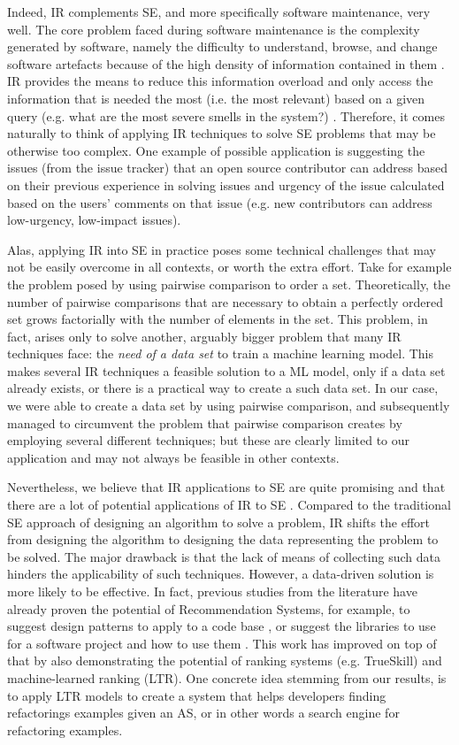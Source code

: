 Indeed, IR complements SE, and more specifically software maintenance, very well.
The core problem faced during software maintenance is the complexity generated by software, namely the difficulty to understand, browse, and change software artefacts because of the high density of information contained in them \cite{Robillard2010}.
IR provides the means to reduce this information overload and only access the information that is needed the most (i.e. the most relevant) based on a given query (e.g. what are the most severe smells in the system?) \cite{Robillard2010}.
Therefore, it comes naturally to think of applying IR techniques to solve SE problems that may be otherwise too complex.
One example of possible application is suggesting the issues (from the issue tracker) that an open source contributor can address based on their previous experience in solving issues and urgency of the issue calculated based on the users' comments on that issue (e.g. new contributors can address low-urgency, low-impact issues).

Alas, applying IR into SE in practice poses some technical challenges that may not be easily overcome in all contexts, or worth the extra effort.
Take for example the problem posed by using pairwise comparison to order a set.
Theoretically, the number of pairwise comparisons that are necessary to obtain a perfectly ordered set grows factorially with the number of elements in the set.
This problem, in fact, arises only to solve another, arguably bigger problem that many IR techniques face: the \emph{need of a data set} to train a machine learning model.
This makes several IR techniques a feasible solution to a ML model, only if a data set already exists, or there is a practical way to create a such data set.
In our case, we were able to create a data set by using pairwise comparison, and subsequently managed to circumvent the problem that pairwise comparison creates by employing several different techniques; but these are clearly limited to our application and may not always be feasible in other contexts.

Nevertheless, we believe that IR applications to SE are quite promising and that there are a lot of potential applications of IR to SE \cite{Happel2008,Robillard2010}.
Compared to the traditional SE approach of designing an algorithm to solve a problem, IR shifts the effort from designing the algorithm to designing the data representing the problem to be solved.
The major drawback is that the lack of means of collecting such data hinders the applicability of such techniques. However, a data-driven solution is more likely to be effective.
In fact, previous studies from the literature have already proven the potential of Recommendation Systems, for example, to suggest design patterns to apply to a code base \cite{Palma2012}, or suggest the libraries to use for a software project and how to use them \cite{DiRocco2021}.
This work has improved on top of that by also demonstrating the potential of ranking systems (e.g. TrueSkill) and machine-learned ranking (LTR).
One concrete idea stemming from our results, is to apply LTR models to create a system that helps developers finding refactorings examples given an AS, or in other words a search engine for refactoring examples.

